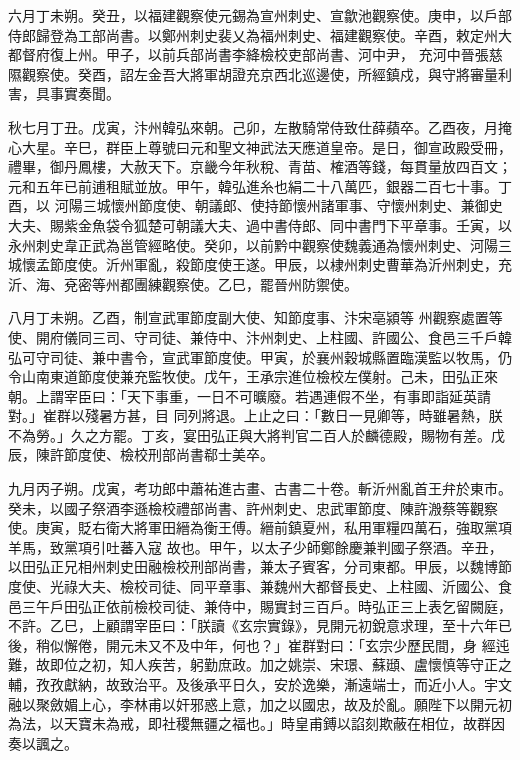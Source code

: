 \begin{pinyinscope}
 六月丁未朔。癸丑，以福建觀察使元錫為宣州刺史、宣歙池觀察使。庚申，以戶部侍郎歸登為工部尚書。以鄭州刺史裴乂為福州刺史、福建觀察使。辛酉，敕定州大都督府復上州。甲子，以前兵部尚書李絳檢校吏部尚書、河中尹，
 充河中晉張慈隰觀察使。癸酉，詔左金吾大將軍胡證充京西北巡邊使，所經鎮戍，與守將審量利害，具事實奏聞。



 秋七月丁丑。戊寅，汴州韓弘來朝。己卯，左散騎常侍致仕薛蘋卒。乙酉夜，月掩心大星。辛巳，群臣上尊號曰元和聖文神武法天應道皇帝。是日，御宣政殿受冊，禮畢，御丹鳳樓，大赦天下。京畿今年秋稅、青苗、榷酒等錢，每貫量放四百文；元和五年已前逋租賦並放。甲午，韓弘進糸也絹二十八萬匹，銀器二百七十事。丁酉，以
 河陽三城懷州節度使、朝議郎、使持節懷州諸軍事、守懷州刺史、兼御史大夫、賜紫金魚袋令狐楚可朝議大夫、過中書侍郎、同中書門下平章事。壬寅，以永州刺史韋正武為邕管經略使。癸卯，以前黔中觀察使魏義通為懷州刺史、河陽三城懷孟節度使。沂州軍亂，殺節度使王遂。甲辰，以棣州刺史曹華為沂州刺史，充沂、海、兗密等州都團練觀察使。乙巳，罷晉州防禦使。



 八月丁未朔。乙酉，制宣武軍節度副大使、知節度事、汴宋亳潁等
 州觀察處置等使、開府儀同三司、守司徒、兼侍中、汴州刺史、上柱國、許國公、食邑三千戶韓弘可守司徒、兼中書令，宣武軍節度使。甲寅，於襄州穀城縣置臨漢監以牧馬，仍令山南東道節度使兼充監牧使。戊午，王承宗進位檢校左僕射。己未，田弘正來朝。上謂宰臣曰：「天下事重，一日不可曠廢。若遇連假不坐，有事即詣延英請對。」崔群以殘暑方甚，目
 同列將退。上止之曰：「數日一見卿等，時雖暑熱，朕不為勞。」久之方罷。丁亥，宴田弘正與大將判官二百人於麟德殿，賜物有差。戊辰，陳許節度使、檢校刑部尚書郗士美卒。



 九月丙子朔。戊寅，考功郎中蕭祐進古畫、古書二十卷。斬沂州亂首王弁於東市。癸未，以國子祭酒李遜檢校禮部尚書、許州刺史、忠武軍節度、陳許溵蔡等觀察使。庚寅，貶右衛大將軍田縉為衡王傅。縉前鎮夏州，私用軍糧四萬石，強取黨項羊馬，致黨項引吐蕃入寇
 故也。甲午，以太子少師鄭餘慶兼判國子祭酒。辛丑，以田弘正兄相州刺史田融檢校刑部尚書，兼太子賓客，分司東都。甲辰，以魏博節度使、光祿大夫、檢校司徒、同平章事、兼魏州大都督長史、上柱國、沂國公、食邑三午戶田弘正依前檢校司徒、兼侍中，賜實封三百戶。時弘正三上表乞留闕庭，不許。乙巳，上顧謂宰臣曰：「朕讀《玄宗實錄》，見開元初銳意求理，至十六年已後，稍似懈倦，開元未又不及中年，何也？」崔群對曰：「玄宗少歷民間，身
 經迍難，故即位之初，知人疾苦，躬勤庶政。加之姚崇、宋璟、蘇頲、盧懷慎等守正之輔，孜孜獻納，故致治平。及後承平日久，安於逸樂，漸遠端士，而近小人。宇文融以聚斂媚上心，李林甫以奸邪惑上意，加之以國忠，故及於亂。願陛下以開元初為法，以天寶未為戒，即社稷無疆之福也。」時皇甫鎛以諂刻欺蔽在相位，故群因奏以諷之。




\end{pinyinscope}
